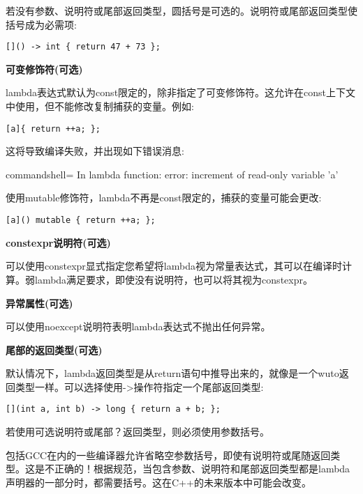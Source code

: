若没有参数、说明符或尾部返回类型，圆括号是可选的。说明符或尾部返回类型使括号成为必需项:

\begin{lstlisting}[style=styleCXX]
[]() -> int { return 47 + 73 };
\end{lstlisting}

\noindent
\textbf{可变修饰符(可选)}

lambda表达式默认为const限定的，除非指定了可变修饰符。这允许在const上下文中使用，但不能修改复制捕获的变量。例如:

\begin{lstlisting}[style=styleCXX]
[a]{ return ++a; };
\end{lstlisting}

这将导致编译失败，并出现如下错误消息:

\begin{tcblisting}{commandshell={}}
In lambda function:
error: increment of read-only variable 'a'
\end{tcblisting}

使用mutable修饰符，lambda不再是const限定的，捕获的变量可能会更改:

\begin{lstlisting}[style=styleCXX]
[a]() mutable { return ++a; };
\end{lstlisting}


\noindent
\textbf{constexpr说明符(可选)}

可以使用constexpr显式指定您希望将lambda视为常量表达式，其可以在编译时计算。弱lambda满足要求，即使没有说明符，也可以将其视为constexpr。

\noindent
\textbf{异常属性(可选)}

可以使用noexcept说明符表明lambda表达式不抛出任何异常。

\noindent
\textbf{尾部的返回类型(可选)}

默认情况下，lambda返回类型是从return语句中推导出来的，就像是一个wuto返回类型一样。可以选择使用->操作符指定一个尾部返回类型:

\begin{lstlisting}[style=styleCXX]
[](int a, int b) -> long { return a + b; };
\end{lstlisting}

若使用可选说明符或尾部？返回类型，则必须使用参数括号。

\begin{tcolorbox}[colback=webgreen!5!white,colframe=webgreen!75!black,title=Note]
包括GCC在内的一些编译器允许省略空参数括号，即使有说明符或尾随返回类型。这是不正确的！根据规范，当包含参数、说明符和尾部返回类型都是lambda声明器的一部分时，都需要括号。这在C++的未来版本中可能会改变。
\end{tcolorbox}














